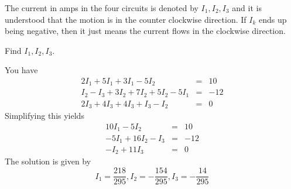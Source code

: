 \begin{enumialphparenastyle}
\begin{ex}
The current in amps in the four circuits is denoted by $I_{1},I_{2},I_{3}$ and it is
understood that the motion is in the counter clockwise direction. If $I_{k}$
ends up being negative, then it just means the current flows in the
clockwise direction. 

Find $I_{1},I_{2},I_{3}$.

\begin{sol}
You
have
\begin{eqnarray*}
2I_{1}+5I_{1}+3I_{1}-5I_{2} &=& 10 \\
I_{2}- I_{3} +3I_{2}+7I_{2}+5I_{2}-5I_{1}  &=&-12 \\
2I_{3}+4I_{3}+4I_{3}+I_{3}-I_{2} &=& 0
\end{eqnarray*}
Simplifying this yields
\begin{eqnarray*}
10I_{1}-5I_{2} &=& 10 \\
-5I_{1} + 16I_{2}- I_{3} &=&-12 \\
-I_{2} + 11I_{3} &=&0
\end{eqnarray*}
The solution is given by 
\[
I_{1}=\frac{218}{295},I_{2}=-\frac{154}{295},I_{3}=-\frac{14}{295}
\]

\end{sol}
\end{ex}

\end{enumialphparenastyle}
